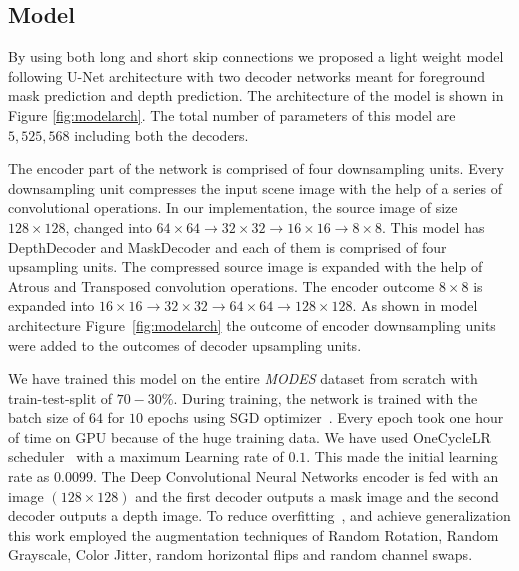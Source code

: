 \documentclass[review]{cvpr}
\begin{document}
\subsection{Model}
By using both long and short skip connections we proposed a light weight model following U-Net architecture with two decoder networks meant for foreground mask prediction and depth prediction. The architecture of the model is shown in Figure \ref{fig:modelarch}. The total number of parameters of this model are $5,525,568$ including both the decoders. 

The encoder part of the network is comprised of four downsampling units. Every downsampling unit compresses the input scene image with the help of a series of convolutional operations. In our implementation, the source image of size $128\times128$, changed into $64\times64 \rightarrow 32\times32 \rightarrow  16\times16 \rightarrow 8\times8$. This model has DepthDecoder and MaskDecoder and each of them is comprised of four upsampling units. The compressed source image is expanded with the help of Atrous and Transposed convolution operations. The encoder outcome $8\times8$ is expanded into $16\times16 \rightarrow 32\times32 \rightarrow 64\times64 \rightarrow 128\times128$. As shown in model architecture Figure~\ref{fig:modelarch} the outcome of encoder downsampling units were added to the outcomes of decoder upsampling units.

We have trained this model on the entire \textit{MODES} dataset from scratch with train-test-split of $70-30\%$. During training, the network is trained with the batch size of $64$ for $10$ epochs using SGD optimizer~\cite{bottou2010large}. Every epoch took one hour of time on GPU because of the huge training data. We have used OneCycleLR scheduler~\cite{smith2018disciplined} with a maximum Learning rate of $0.1$. This made the initial learning rate as $0.0099$. The Deep Convolutional Neural Networks encoder is fed with an image $(128\times128)$ and the first decoder outputs a mask image and the second decoder outputs a depth image. To reduce overfitting~\cite{perez2017effectiveness}, and achieve generalization this work employed the augmentation techniques of Random Rotation, Random Grayscale, Color Jitter, random horizontal flips and random channel swaps. 
\end{document}
